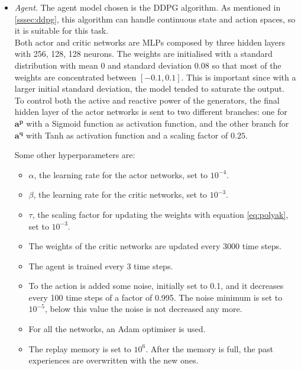 \begin{itemize}
    \item \emph{Agent}. The agent model chosen is the \gls{DDPG} algorithm. As mentioned in \ref{sssec:ddpg}, this algorithm can handle continuous state and action spaces, so it is suitable for this task.\\
    
    Both actor and critic networks are \glspl{MLP} composed by three hidden layers with 256, 128, 128 neurons. The weights are initialised with a standard distribution with mean 0 and standard deviation $0.08$ so that most of the weights are concentrated between $[-0.1,0.1]$. This is important since with a larger initial standard deviation, the model tended to saturate the output.\\
    
    To control both the active and reactive power of the generators, the final hidden layer of the actor networks is sent to two different branches: one for $\mathbf{a^p}$ with a Sigmoid function as activation function, and the other branch for $\mathbf{a^q}$ with \gls{Tanh} as activation function and a scaling factor of $0.25$.
    
    Some other hyperparameters are:
    \begin{itemize}
        \item $\alpha$, the learning rate for the actor networks, set to $10^{-4}$.
        \item $\beta$, the learning rate for the critic networks, set to $10^{-3}$.
        \item $\tau$, the scaling factor for updating the weights with equation \ref{eq:polyak}, set to $10^{-3}$.
        \item The weights of the critic networks are updated every 3000 time steps.
        \item The agent is trained every 3 time steps.
        \item To the action is added some noise, initially set to 0.1, and it decreases every 100 time steps of a factor of 0.995. The noise minimum is set to $10^{-5}$, below this value the noise is not decreased any more.
        \item For all the networks, an Adam optimiser is used.
        \item The replay memory is set to $10^6$. After the memory is full, the past experiences are overwritten with the new ones.
    \end{itemize}
    
\end{itemize}

